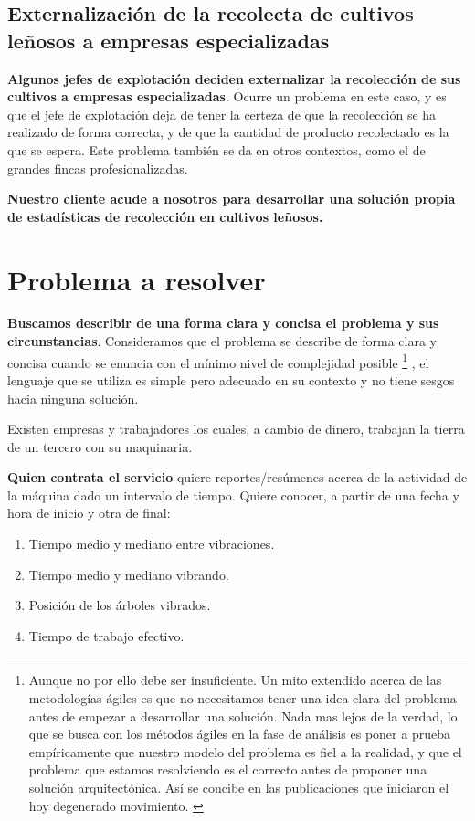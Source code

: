 \subsection{Externalización de la recolecta de cultivos leñosos a empresas especializadas}

\textbf{Algunos jefes de explotación deciden externalizar la recolección
de sus cultivos a empresas especializadas}. Ocurre un problema en este
caso, y es que el jefe de explotación deja de tener la certeza de que la
recolección se ha realizado de forma correcta, y de que la cantidad de producto
recolectado es la que se espera. Este problema también se da en otros contextos,
como el de grandes fincas profesionalizadas.

\textbf{Nuestro cliente acude a nosotros para desarrollar una solución propia de
estadísticas de recolección en cultivos leñosos.}

\section{Problema a resolver}

\textbf{Buscamos describir de una forma clara y concisa el problema y sus
circunstancias}. Consideramos que el problema se describe de forma clara y
concisa cuando se enuncia con el mínimo nivel de complejidad posible%
%
\footnote{Aunque
no por ello debe ser insuficiente. Un mito extendido acerca de las metodologías ágiles
es que no necesitamos tener una idea clara del problema antes de empezar a desarrollar
una solución. Nada mas lejos de la verdad, lo que se busca con los métodos ágiles en la
fase de análisis es poner a prueba empíricamente que nuestro modelo del problema es fiel
a la realidad, y que el problema que estamos resolviendo es el correcto antes de proponer
una solución arquitectónica. Así se concibe en las publicaciones que iniciaron el hoy
degenerado movimiento. \cite{AgileBackToBasics}
}%
, el lenguaje que se utiliza es simple pero adecuado
en su contexto y no tiene sesgos hacia ninguna solución.

Existen empresas y trabajadores los cuales, a cambio de dinero, trabajan la
tierra de un tercero con su maquinaria.

\textbf{Quien contrata el servicio} quiere reportes/resúmenes acerca de la actividad
de la máquina dado un intervalo de tiempo. Quiere conocer, a partir de una fecha y hora de inicio y otra de final:

\begin{enumerate}
   \item Tiempo medio y mediano entre vibraciones.
   \item Tiempo medio y mediano vibrando.
   \item Posición de los árboles vibrados.
   \item Tiempo de trabajo efectivo.
\end{enumerate}

